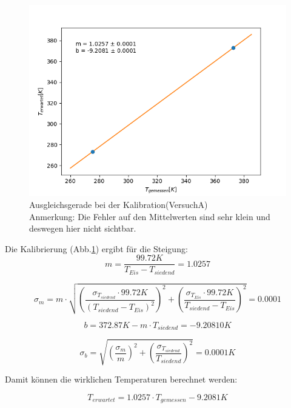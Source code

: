 \documentclass[12pt,a4paper]{article}
\begin{document}
\begin{figure}[H]
\begin{center}
\centering
\includegraphics[width=0.9\linewidth]{Bilder/KalibrationA}
\caption[Gerade Kalibration A]{Ausgleichsgerade bei der Kalibration(VersuchA)\\
Anmerkung: Die Fehler auf den Mittelwerten sind sehr klein und deswegen hier nicht sichtbar.}
\label{fig:GeradeKaliA}
\end{center}
\end{figure}


Die Kalibrierung (Abb.\ref{fig:GeradeKaliA}) ergibt für die Steigung:
\begin{equation}
m = \dfrac{99.72K}{T_{Eis}-T_{siedend}} = 1.0257
\end{equation}

\begin{equation}
\sigma_{m} = m\cdot \sqrt{(\dfrac{\sigma_{T_{siedend}}\cdot 99.72K}{(T_{siedend}-T_{Eis})^{2}})^{2}+(\dfrac{\sigma_{T_{Eis}}\cdot 99.72K}{T_{siedend}-T_{Eis}})^{2}} = 0.0001
\end{equation}

\begin{equation}
b = 372.87K-m\cdot T_{siedend} = -9.20810K
\end{equation}

\begin{equation}
\sigma_{b} = \sqrt{(\dfrac{\sigma_{m}}{m})^{2}+(\dfrac{\sigma_{T_{siedend}}}{T_{siedend}})^{2}} = 0.0001K
\end{equation}

Damit können die wirklichen Temperaturen berechnet werden:

\begin{equation}
T_{erwartet}=1.0257\cdot T_{gemessen}-9.2081K
\end{equation}
\end{document}
